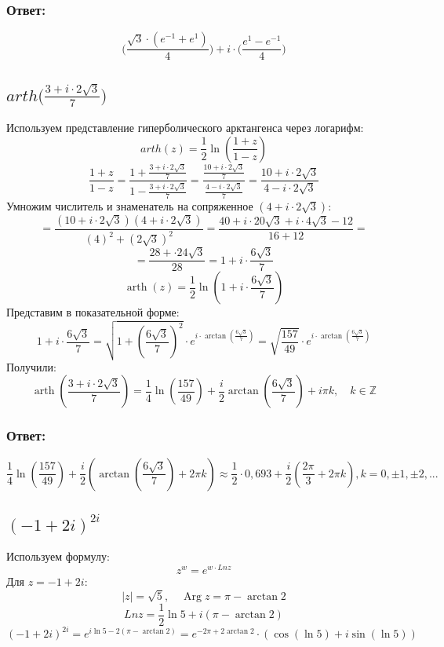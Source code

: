 \documentclass[12pt]{article}
\begin{document}
\subsubsection*{Ответ:}
$$\bigg(\frac{\sqrt{3} \cdot (e^{-1} + e^1)}{4} \bigg) + i \cdot \bigg(\frac{e^1 - e^{-1}}{4} \bigg)$$

\subsection{$arth \bigg(\frac{3 + i\cdot2\sqrt{3}}{7}\bigg)$}
Используем представление гиперболического арктангенса через логарифм:
$$arth (z) = \frac{1}{2} \ln\left(\frac{1+z}{1-z}\right)$$
$$\frac{1+z}{1-z} = \frac{1 + \frac{3 + i\cdot 2\sqrt{3}}{7}}{1 - \frac{3 + i\cdot 2\sqrt{3}}{7}} = \frac{\frac{10 + i\cdot 2\sqrt{3}}{7}}{\frac{4 - i \cdot 2 \sqrt{3}}{7}} = \frac{10 + i\cdot2\sqrt{3}}{4 - i\cdot2\sqrt{3}}$$
Умножим числитель и знаменатель на сопряженное $(4 + i\cdot2\sqrt{3})$:
$$= \frac{(10 + i\cdot2\sqrt{3})(4 + i\cdot2\sqrt{3})}{(4)^2 + (2\sqrt{3})^2} = \frac{40 + i\cdot20\sqrt{3} + i\cdot4\sqrt{3} - 12}{16 + 12} =$$
$$= \frac{28 + \cdot24\sqrt{3}}{28} = 1 + i\cdot\frac{6\sqrt{3}}{7}$$
$$\operatorname{arth}(z) = \frac{1}{2} \ln\left(1 + i\cdot\frac{6\sqrt{3}}{7}\right)$$
Представим в показательной форме:
$$1 + i\cdot\frac{6\sqrt{3}}{7} = \sqrt{1 + \left(\frac{6\sqrt{3}}{7}\right)^2} \cdot e^{i\cdot\arctan\left(\frac{6\sqrt{3}}{7}\right)} = \sqrt{\frac{157}{49}} \cdot e^{i\cdot\arctan\left(\frac{6\sqrt{3}}{7}\right)}$$
Получили:
$$\operatorname{arth}\left(\frac{3 + i\cdot2\sqrt{3}}{7}\right) = \frac{1}{4}\ln\left(\frac{157}{49}\right) + \frac{i}{2}\arctan\left(\frac{6\sqrt{3}}{7}\right) + i\pi k, \quad k \in \mathbb{Z}$$
\subsubsection*{Ответ:}
$$\frac{1}{4}\ln\left(\frac{157}{49}\right) + \frac{i}{2}\left(\arctan\left(\frac{6\sqrt{3}}{7}\right) + 2\pi k\right) \approx \frac{1}{2} \cdot 0,693 + \frac{i}{2}(\frac{2\pi}{3} + 2\pi k), k = 0, \pm 1, \pm 2, ...$$

\subsection{$(-1 + 2i)^{2i}$}
Используем формулу: 
$$z^w = e^{w \cdot Ln z}$$
Для $z = -1 + 2i$:
$$|z| = \sqrt{5}, \quad \operatorname{Arg} z = \pi - \arctan 2$$
$$Ln z = \frac{1}{2}\ln 5 + i(\pi - \arctan 2)$$
$$(-1 + 2i)^{2i} = e^{i\ln 5 - 2(\pi - \arctan 2)}
= e^{-2\pi + 2\arctan 2} \cdot (\cos(\ln 5) + i\sin(\ln 5))$$
\end{document}

